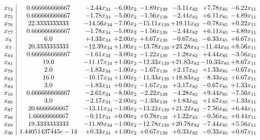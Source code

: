 \documentclass[8pt]{article}
\begin{document}
\[\begin{array}{c| c c@{\hskip 2pt} c@{\hskip 2pt} c@{\hskip 2pt} c@{\hskip 2pt} c@{\hskip 2pt} c@{\hskip 2pt} }
 x_{74}   &  0.666666666667 & -2.44 x_{34} & -6.00 x_{2} & -1.89 x_{139} & -3.11 x_{82} & +  7.78 x_{85} & -6.22 x_{11}\\
 x_{75}   &  0.666666666667 & -1.78 x_{34} & -5.00 x_{2} & -1.56 x_{139} & -2.44 x_{82} & +  6.11 x_{85} & -4.89 x_{11}\\
 x_{76}   &  22.3333333333 & -14.56 x_{34} & -7.00 x_{2} & -15.11 x_{139} & + 19.11 x_{82} & -0.78 x_{85} & +  0.22 x_{11}\\
 x_{77}   &  0.666666666667 & -1.78 x_{34} & -5.00 x_{2} & -1.56 x_{139} & -2.44 x_{82} & +  6.11 x_{85} & -4.89 x_{11}\\
 x_{8}   &  6.0 & +  4.33 x_{34} & +  2.00 x_{2} & +  4.67 x_{139} & -0.67 x_{82} & -6.33 x_{85} & +  6.67 x_{11}\\
 x_{7}   &  20.3333333333 & -12.39 x_{34} & +  1.00 x_{2} & -13.78 x_{139} & + 23.28 x_{82} & -11.44 x_{85} & +  8.56 x_{11}\\
 x_{64}   &  0.666666666667 & -1.61 x_{34} & -3.00 x_{2} & -1.22 x_{139} & -1.28 x_{82} & +  4.44 x_{85} & -3.56 x_{11}\\
 x_{81}   &  19.0 & -11.17 x_{34} & +  1.00 x_{2} & -12.33 x_{139} & + 21.83 x_{82} & -10.33 x_{85} & +  8.67 x_{11}\\
 x_{78}   &  2.0 & -1.83 x_{34} & -1.00 x_{2} & -1.67 x_{139} & +  2.17 x_{82} & +  1.33 x_{85} & -0.67 x_{11}\\
 x_{83}   &  16.0 & -10.17 x_{34} & +  1.00 x_{2} & -11.33 x_{139} & + 18.83 x_{82} & -8.33 x_{85} & +  6.67 x_{11}\\
 x_{84}   &  3.0 & -1.83 x_{34} & +  0.00 x_{2} & -1.67 x_{139} & +  3.17 x_{82} & -0.67 x_{85} & +  1.33 x_{11}\\
 x_{10}   &  0.666666666667 & -2.61 x_{34} & -8.00 x_{2} & -2.22 x_{139} & -4.28 x_{82} & +  9.44 x_{85} & -7.56 x_{11}\\
 x_{86}   &  3.0 & -2.17 x_{34} & -2.00 x_{2} & -1.33 x_{139} & +  1.83 x_{82} & +  1.67 x_{85} & -1.33 x_{11}\\
 x_{87}   &  20.6666666667 & -13.11 x_{34} & -1.00 x_{2} & -13.22 x_{139} & + 21.22 x_{82} & -7.56 x_{85} & +  6.44 x_{11}\\
 x_{88}   &  1.66666666667 & -0.11 x_{34} & +  0.00 x_{2} & +  0.78 x_{139} & +  1.22 x_{82} & -0.56 x_{85} & +  0.44 x_{11}\\
 x_{89}   &  19.3333333333 & -11.89 x_{34} & -1.00 x_{2} & -12.78 x_{139} & + 20.78 x_{82} & -7.44 x_{85} & +  5.56 x_{11}\\
 x_{90}   &  1.44051437445e-14 & +  0.33 x_{34} & +  1.00 x_{2} & +  0.67 x_{139} & +  0.33 x_{82} & -0.33 x_{85} & +  0.67 x_{11}\\

\end{array}\]
\end{document}
